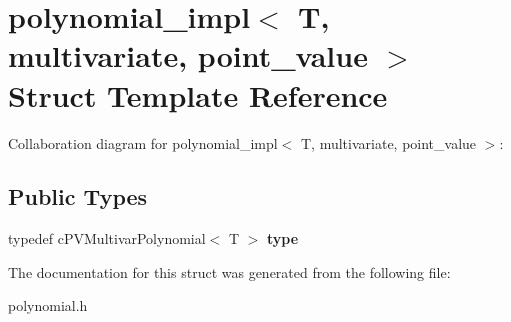 \hypertarget{structpolynomial__impl_3_01T_00_01multivariate_00_01point__value_01_4}{\section{polynomial\-\_\-impl$<$ T, multivariate, point\-\_\-value $>$ Struct Template Reference}
\label{structpolynomial__impl_3_01T_00_01multivariate_00_01point__value_01_4}
}


Collaboration diagram for polynomial\-\_\-impl$<$ T, multivariate, point\-\_\-value $>$\-:
\subsection*{Public Types}
\begin{DoxyCompactItemize}
\item 
\hypertarget{structpolynomial__impl_3_01T_00_01multivariate_00_01point__value_01_4_a2d3c3fac2ae46c37c81d79810da98c36}{typedef c\-P\-V\-Multivar\-Polynomial$<$ T $>$ {\bfseries type}}\label{structpolynomial__impl_3_01T_00_01multivariate_00_01point__value_01_4_a2d3c3fac2ae46c37c81d79810da98c36}

\end{DoxyCompactItemize}


The documentation for this struct was generated from the following file\-:\begin{DoxyCompactItemize}
\item 
polynomial.\-h\end{DoxyCompactItemize}
